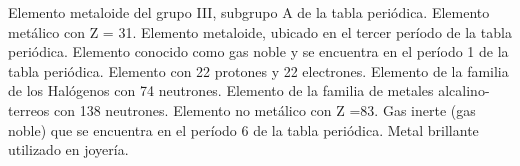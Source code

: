 \begin{minipage}{0.7\textwidth}
    \begin{choices}
        \choice Elemento metaloide del grupo III, subgrupo A de la tabla periódica.
        \choice Elemento metálico con Z = 31.
        \choice Elemento metaloide, ubicado en el tercer período de la tabla periódica.
        \choice Elemento conocido como gas noble y se encuentra en el período 1 de la tabla periódica.
        \choice Elemento con 22 protones y 22 electrones.
        \choice Elemento de la familia de los Halógenos con 74 neutrones.
        \choice Elemento de la familia de metales alcalino-terreos con 138 neutrones.
        \choice Elemento no metálico con Z =83.
        \choice Gas inerte (gas noble) que se encuentra en el período 6 de la tabla periódica.
        \choice Metal brillante utilizado en joyería.
    \end{choices}
\end{minipage}